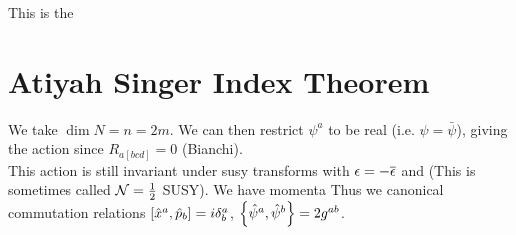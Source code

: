 \documentclass{article}
\begin{document}
This is the 

\section{Atiyah Singer Index Theorem}
We take $\dim N = n = 2m$. We can then restrict $\psi^a$ to be real (i.e. $\psi= \bar{\psi}$), giving the action
since $R_{a[bcd]}=0$ (Bianchi). \\
This action is still invariant under susy transforms with $ \eps = - \bar{\eps}$ and 
(This is sometimes called $\mc{N}=\frac{1}{2}$ SUSY). We have momenta 
Thus we canonical commutation relations $\comm[\hat{x}^a]{\hat{p}_b} = i \delta^a_b$, $\acomm[\hat{\psi}^a]{\hat{\psi}^b} = 2g^{ab}$. 


\end{document}
